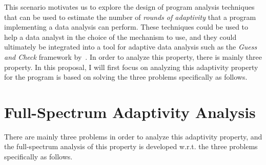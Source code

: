 This scenario motivates us to explore the design of program analysis techniques that can be used to estimate the number of \emph{rounds of adaptivity} that a program implementing a data analysis can perform. These techniques could be used to help a data analyst in the choice of the mechanism to use,
and they
could ultimately be integrated into a tool for adaptive data analysis such as the \emph{Guess and Check} framework by~\cite{RogersRSSTW20}. 
%
In order to analyze this property, there is mainly three property. 
In this proposal, I will first focus on analyzing 
this adaptivity property for the program is based on solving the three problems specifically as follows.

\section{Full-Spectrum Adaptivity Analysis}
\label{sec:intro-adapt}
There are mainly three problems in order to analyze this adaptivity property, 
and the full-spectrum analysis of this property is 
developed w.r.t. the three problems specifically as follows.

